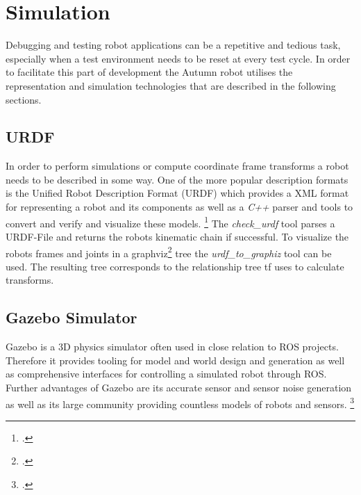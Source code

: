 \section{Simulation}
Debugging and testing robot applications can be a repetitive and tedious task, especially when a test environment needs to be reset at every test cycle. In order to facilitate this part of development the Autumn robot utilises the representation and simulation technologies that are described in the following sections.

\subsection{URDF}
In order to perform simulations or compute coordinate frame transforms a robot needs to be described in some way. One of the more popular description formats is the Unified Robot Description Format (URDF) which provides a XML format for representing a robot and its components as well as a \textit{C++} parser and tools to convert and verify and visualize these models. \footcite{openSourceRoboticsFoundationURDFNodate}
The \textit{check\_urdf} tool parses a URDF-File and returns the robots kinematic chain if successful.
To visualize the robots frames and joints in a graphviz\footcite{graphvizAuthorsAboutNodate} tree the \textit{urdf\_to\_graphiz} tool can be used. The resulting tree corresponds to the relationship tree tf uses to calculate transforms.

\subsection{Gazebo Simulator}\label{section:gazebo}
Gazebo is a 3D physics simulator often used in close relation to ROS projects. Therefore it provides tooling for model and world design and generation as well as comprehensive interfaces for controlling a simulated robot through ROS. Further advantages of Gazebo are its accurate sensor and sensor noise generation as well as its large community providing countless models of robots and sensors. \footcite{openSourceRoboticsFoundationGazeboNodate}

\filbreak